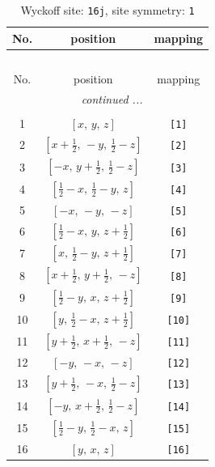 \documentclass[fleqn,8pt]{jsarticle}
\begin{document}
\begin{longtable}{ccc}
\caption{Wyckoff site: {\tt 16j}, site symmetry: {\tt 1}}
 \\
 \hline \hline
No. & position & mapping \\ \hline \endfirsthead

\multicolumn{2}{l}{\tablename\ \thetable{}} \\
 \hline \hline
No. & position & mapping \\ \hline \endhead

 \hline \hline
\multicolumn{2}{r}{\footnotesize\it continued ...} \\ \endfoot

 \hline \hline
\multicolumn{2}{r}{} \\ \endlastfoot

1 & $\left[ x,\, y,\, z \right]$ & {\tt [1]} \\ \hline
2 & $\left[ x + \frac{1}{2},\, - y,\, \frac{1}{2} - z \right]$ & {\tt [2]} \\ \hline
3 & $\left[ - x,\, y + \frac{1}{2},\, \frac{1}{2} - z \right]$ & {\tt [3]} \\ \hline
4 & $\left[ \frac{1}{2} - x,\, \frac{1}{2} - y,\, z \right]$ & {\tt [4]} \\ \hline
5 & $\left[ - x,\, - y,\, - z \right]$ & {\tt [5]} \\ \hline
6 & $\left[ \frac{1}{2} - x,\, y,\, z + \frac{1}{2} \right]$ & {\tt [6]} \\ \hline
7 & $\left[ x,\, \frac{1}{2} - y,\, z + \frac{1}{2} \right]$ & {\tt [7]} \\ \hline
8 & $\left[ x + \frac{1}{2},\, y + \frac{1}{2},\, - z \right]$ & {\tt [8]} \\ \hline
9 & $\left[ \frac{1}{2} - y,\, x,\, z + \frac{1}{2} \right]$ & {\tt [9]} \\ \hline
10 & $\left[ y,\, \frac{1}{2} - x,\, z + \frac{1}{2} \right]$ & {\tt [10]} \\ \hline
11 & $\left[ y + \frac{1}{2},\, x + \frac{1}{2},\, - z \right]$ & {\tt [11]} \\ \hline
12 & $\left[ - y,\, - x,\, - z \right]$ & {\tt [12]} \\ \hline
13 & $\left[ y + \frac{1}{2},\, - x,\, \frac{1}{2} - z \right]$ & {\tt [13]} \\ \hline
14 & $\left[ - y,\, x + \frac{1}{2},\, \frac{1}{2} - z \right]$ & {\tt [14]} \\ \hline
15 & $\left[ \frac{1}{2} - y,\, \frac{1}{2} - x,\, z \right]$ & {\tt [15]} \\ \hline
16 & $\left[ y,\, x,\, z \right]$ & {\tt [16]} \\
\end{longtable}
\end{document}
